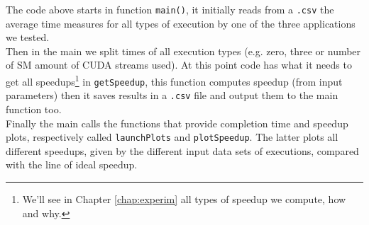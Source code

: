 	The code above starts in function \texttt{main()}, it initially reads from a \texttt{.csv} the average time measures for all types of execution by one of the three applications we tested.\\
	Then in the main we split times of all execution types (e.g. zero, three or number of SM amount of CUDA streams used). At this point code has what it needs to get all speedups\footnote{We'll see in Chapter \ref{chap:experim} all types of speedup we compute, how and why.} in \texttt{getSpeedup}, this function computes speedup (from input parameters) then it saves results in a \texttt{.csv} file and output them to the main function too.\\
	Finally the main calls the functions that provide completion time and speedup plots, respectively called \texttt{launchPlots} and \texttt{plotSpeedup}. The latter plots all different speedups, given by the different input data sets of executions, compared with the line of ideal speedup.
	

